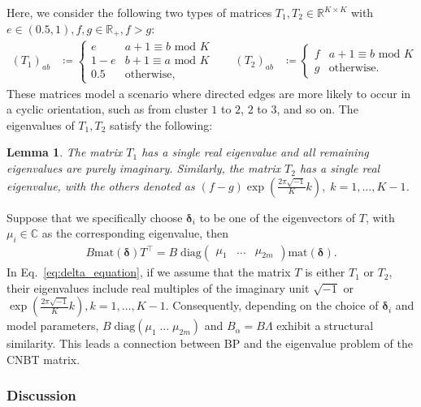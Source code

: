 \documentclass{article}
\theoremstyle{plain}
\newtheorem{lemma}{Lemma}
\begin{document}
Here, we consider the following two types of matrices $T_1, T_2 \in \mathbb{R}^{K\times K}$ with $e \in (0.5,1), f, g \in \mathbb{R}_{+}, f > g$:
\begin{align*}
	(T_1)_{ab} & \coloneqq
	\begin{cases}
		e   & a+1 \equiv b \text{ mod } K
		\\
		1-e & b+1 \equiv a \text{ mod } K
		\\
		0.5 & \text{otherwise}
		,
	\end{cases}
	\quad      &
	(T_2)_{ab} & \coloneqq
	\begin{cases}
		f & a+1 \equiv b \text{ mod } K
		\\
		g & \text{otherwise}.
	\end{cases}
\end{align*}
These matrices model a scenario where directed edges are more likely to occur in a cyclic orientation, such as from cluster $1$ to $2$, $2$ to $3$, and so on.
The eigenvalues of $T_1, T_2$ satisfy the following:
\begin{lemma}\label{lemma:spectral_matrix_T}
	The matrix $T_1$ has a single real eigenvalue and all remaining eigenvalues are purely imaginary. Similarly, the matrix $T_2$ has a single real eigenvalue, with the others denoted as $(f-g) \exp \left( \frac{2\pi \sqrt{-1}}{K} k \right),\; k=1,\dots, K-1$.
\end{lemma}
Suppose that we specifically choose $\bm{\delta}_i$ to be one of the eigenvectors of $T$, with $\mu_i \in \mathbb{C}$ as the corresponding eigenvalue, then
\begin{align*}
	B \text{mat}(\bm{\delta}) T^{\top} = B \; \text{diag}\begin{pmatrix} \mu_1 & \dots & \mu_{2m} \end{pmatrix} \text{mat}(\bm{\delta})
	.
\end{align*}
In Eq.~\eqref{eq:delta_equation}, if we assume that the matrix $T$ is either $T_1$ or $T_2$,
their eigenvalues include real multiples of the imaginary unit $\sqrt{-1}$ or $\exp(\frac{2\pi \sqrt{-1}}{K} k), k=1,\dots, K-1$.
Consequently, depending on the choice of $\bm{\delta}_i$ and model parameters, $B\; \text{diag}(\mu_1\; \dots\; \mu_{2m})$ and $B_{\alpha} = B\Lambda$ exhibit a structural similarity. This leads a connection between BP and the eigenvalue problem of the CNBT matrix.

\subsubsection{Discussion}\label{section:discuss}
\end{document}
